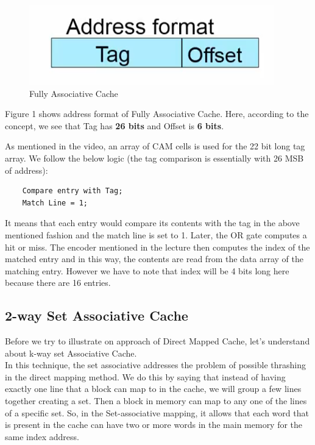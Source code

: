 \documentclass[12pt]{article}
\begin{document}
\begin{figure}
    \centering
    \includegraphics{Assignment-9/fully_associative_cache.png}
    \caption{Fully Associative Cache}
\end{figure}

Figure 1 shows address format of Fully Associative Cache. Here, according to the concept, we see that Tag has \textbf{26 bits} and Offset is \textbf{6 bits}. 

As mentioned in the video, an array of CAM cells is used for the 22 bit long tag array. We follow the below logic (the tag comparison is essentially with 26 MSB of address):
\begin{verbatim}
    Compare entry with Tag;
    Match Line = 1;
\end{verbatim}
It means that each entry would compare its contents with the tag in the above mentioned fashion and the match line is set to 1. Later, the OR gate computes a hit or miss. The encoder mentioned in the lecture then computes the index of the matched entry and in this way, the contents are read from the data array of the matching entry. However we have to note that index will be 4 bits long here because there are 16 entries.
\subsection{2-way Set Associative Cache}
Before we try to illustrate on approach of Direct Mapped Cache, let's understand about k-way set Associative Cache. \\

In this technique, the set associative addresses the problem of possible thrashing in the direct mapping method. We do this by saying that instead of having exactly one line that a block can map to in the cache, we will group a few lines together creating a set. Then a block in memory can map to any one of the lines of a specific set. So, in the Set-associative mapping, it allows that each word that is present in the cache can have two or more words in the main memory for the same index address. \\ 
\end{document}
